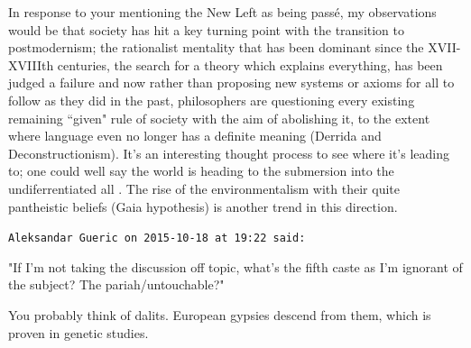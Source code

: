 \begin{footnotesize}
\begin{sffamily}
In response to your mentioning the New Left as being passé, my observations would be that society has hit a key turning point with the transition to postmodernism; the rationalist mentality that has been dominant since the XVII-XVIIIth centuries, the search for a theory which explains everything, has been judged a failure and now rather than proposing new systems or axioms for all to follow as they did in the past, philosophers are questioning every existing remaining ``given" rule of society with the aim of abolishing it, to the extent where language even no longer has a definite meaning (Derrida and Deconstructionism). It's an interesting thought process to see where it's leading to; one could well say the world is heading to the submersion into the undiferrentiated all . The rise of the environmentalism with their quite pantheistic beliefs (Gaia hypothesis) is another trend in this direction.


\hfill

\texttt{Aleksandar Gueric on 2015-10-18 at 19:22 said: }

"If I'm not taking the discussion off topic, what's the fifth caste as I'm ignorant of the subject? The pariah/untouchable?"

You probably think of dalits. European gypsies descend from them, which is proven in genetic studies.


\hfill


\end{sffamily}\end{footnotesize}
